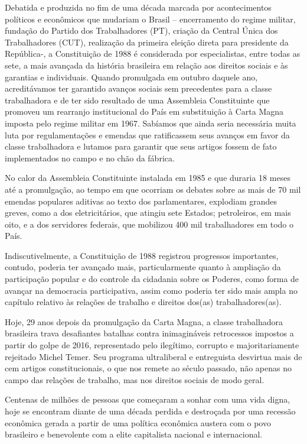 Debatida e produzida no fim de uma década marcada por acontecimentos
políticos e econômicos que mudariam o Brasil -- encerramento do regime
militar, fundação do Partido dos Trabalhadores (PT), criação da Central
Única dos Trabalhadores (CUT), realização da primeira eleição direta
para presidente da República-, a Constituição de 1988 é considerada por
especialistas, entre todas as sete, a mais avançada da história
brasileira em relação aos direitos sociais e às garantias e individuais.
Quando promulgada em outubro daquele ano, acreditávamos ter garantido
avanços sociais sem precedentes para a classe trabalhadora e de ter sido
resultado de uma Assembleia Constituinte que promoveu um rearranjo
institucional do País em substituição à Carta Magna imposta pelo regime
militar em 1967. Sabíamos que ainda seria necessária muita luta por
regulamentações e emendas que ratificassem seus avanços em favor da
classe trabalhadora e lutamos para garantir que seus artigos fossem de
fato implementados no campo e no chão da fábrica.

No calor da Assembleia Constituinte instalada em 1985 e que duraria 18
meses até a promulgação, ao tempo em que ocorriam os debates sobre as
mais de 70 mil emendas populares aditivas ao texto dos parlamentares,
explodiam grandes greves, como a dos eletricitários, que atingiu sete
Estados; petroleiros, em mais oito, e a dos servidores federais, que
mobilizou 400 mil trabalhadores em todo o País.

Indiscutivelmente, a Constituição de 1988 registrou progressos
importantes, contudo, poderia ter avançado mais, particularmente quanto
à ampliação da participação popular e do controle da cidadania sobre os
Poderes, como forma de avançar na democracia participativa, assim como
poderia ter sido mais ampla no capítulo relativo às relações de trabalho
e direitos dos(as) trabalhadores(as).

Hoje, 29 anos depois da promulgação da Carta Magna, a classe
trabalhadora brasileira trava desafiantes batalhas contra inimagináveis
retrocessos impostos a partir do golpe de 2016, representado pelo
ilegítimo, corrupto e majoritariamente rejeitado Michel Temer. Seu
programa ultraliberal e entreguista desvirtua mais de cem artigos
constitucionais, o que nos remete ao século passado, não apenas no campo
das relações de trabalho, mas nos direitos sociais de modo geral.

Centenas de milhões de pessoas que começaram a sonhar com uma vida
digna, hoje se encontram diante de uma década perdida e destroçada por
uma recessão econômica gerada a partir de uma política econômica austera
com o povo brasileiro e benevolente com a elite capitalista nacional e
internacional.

